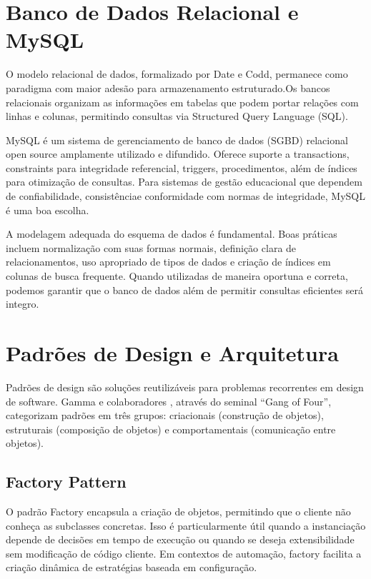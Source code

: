 \section{Banco de Dados Relacional e MySQL}
\label{sec:revbib:bd}

O modelo relacional de dados, formalizado por Date e Codd, permanece como
paradigma com maior adesão para armazenamento estruturado.Os bancos relacionais organizam as informações em tabelas
que podem portar relações com linhas e colunas, permitindo consultas via Structured Query Language (SQL).

MySQL \cite{MySQL2024} é um sistema de gerenciamento de banco de dados (SGBD)
relacional open source amplamente utilizado e difundido. Oferece
suporte a transactions, constraints para integridade referencial, triggers, procedimentos, além de índices para otimização de consultas.
Para sistemas de gestão educacional que dependem de confiabilidade, consistênciae conformidade com normas de integridade,
MySQL é uma boa escolha.

A modelagem adequada do esquema de dados é fundamental. Boas práticas incluem
normalização com suas formas normais, definição clara de relacionamentos,
uso apropriado de tipos de dados e criação de índices em colunas de busca
frequente. Quando utilizadas de maneira oportuna e correta, podemos garantir
que o banco
de dados além de permitir consultas eficientes será integro.

\section{Padrões de Design e Arquitetura}
\label{sec:revbib:patterns}

Padrões de design são soluções reutilizáveis para problemas recorrentes em
design de software. Gamma e colaboradores \cite{GammaEtAl1994}, através do
seminal ``Gang of Four'', categorizam padrões em três grupos: criacionais
(construção de objetos), estruturais (composição de objetos) e comportamentais
(comunicação entre objetos).

\subsection{Factory Pattern}
O padrão Factory encapsula a criação de objetos, permitindo que o cliente não
conheça as subclasses concretas. Isso é particularmente útil quando a
instanciação depende de decisões em tempo de execução ou quando se deseja
extensibilidade sem modificação de código cliente. Em contextos de automação,
factory facilita a criação dinâmica de estratégias baseada em configuração.

